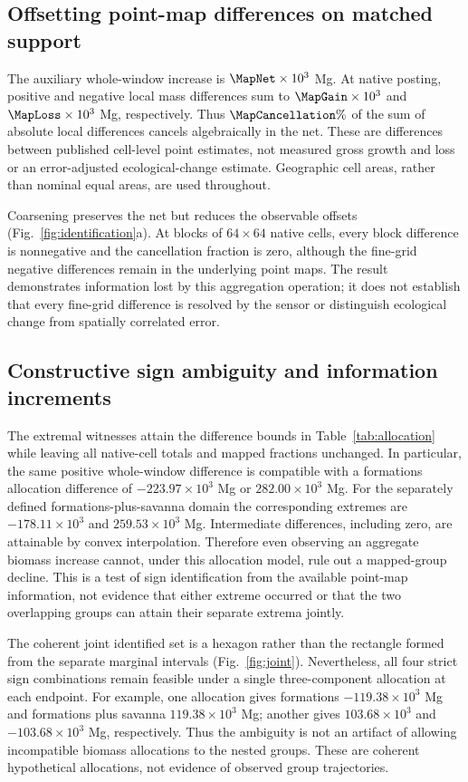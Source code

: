 \subsection{Offsetting point-map differences on matched support}
The auxiliary whole-window increase is $\MapNet\times10^3$ Mg. At native posting, positive and negative local mass differences sum to $\MapGain\times10^3$ and $\MapLoss\times10^3$ Mg, respectively. Thus $\MapCancellation\%$ of the sum of absolute local differences cancels algebraically in the net. These are differences between published cell-level point estimates, not measured gross growth and loss or an error-adjusted ecological-change estimate. Geographic cell areas, rather than nominal equal areas, are used throughout.

Coarsening preserves the net but reduces the observable offsets (Fig.~\ref{fig:identification}a). At blocks of $64\times64$ native cells, every block difference is nonnegative and the cancellation fraction is zero, although the fine-grid negative differences remain in the underlying point maps. The result demonstrates information lost by this aggregation operation; it does not establish that every fine-grid difference is resolved by the sensor or distinguish ecological change from spatially correlated error.

\subsection{Constructive sign ambiguity and information increments}
The extremal witnesses attain the difference bounds in Table~\ref{tab:allocation} while leaving all native-cell totals and mapped fractions unchanged. In particular, the same positive whole-window difference is compatible with a formations allocation difference of $-223.97\times10^3$ Mg or $282.00\times10^3$ Mg. For the separately defined formations-plus-savanna domain the corresponding extremes are $-178.11\times10^3$ and $259.53\times10^3$ Mg. Intermediate differences, including zero, are attainable by convex interpolation. Therefore even observing an aggregate biomass increase cannot, under this allocation model, rule out a mapped-group decline. This is a test of sign identification from the available point-map information, not evidence that either extreme occurred or that the two overlapping groups can attain their separate extrema jointly.

The coherent joint identified set is a hexagon rather than the rectangle formed from the separate marginal intervals (Fig.~\ref{fig:joint}). Nevertheless, all four strict sign combinations remain feasible under a single three-component allocation at each endpoint. For example, one allocation gives formations $-119.38\times10^3$ Mg and formations plus savanna $119.38\times10^3$ Mg; another gives $103.68\times10^3$ and $-103.68\times10^3$ Mg, respectively. Thus the ambiguity is not an artifact of allowing incompatible biomass allocations to the nested groups. These are coherent hypothetical allocations, not evidence of observed group trajectories.

